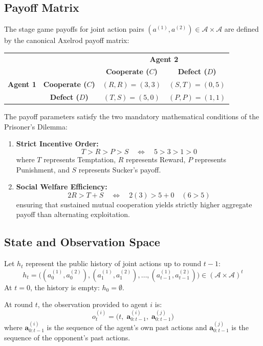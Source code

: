 ﻿\documentclass[11pt,a4paper]{article}
\begin{document}
\subsection{Payoff Matrix}
The stage game payoffs for joint action pairs $(a^{(1)}, a^{(2)}) \in \mathcal{A} \times \mathcal{A}$ are defined by the canonical Axelrod payoff matrix:

\begin{center}
\begin{tabular}{cc|cc}
\multicolumn{2}{c}{} & \multicolumn{2}{c}{\textbf{Agent 2}} \\
& & \textbf{Cooperate ($C$)} & \textbf{Defect ($D$)} \\
\hline
\textbf{Agent 1} & \textbf{Cooperate ($C$)} & $(R, R) = (3, 3)$ & $(S, T) = (0, 5)$ \\
& \textbf{Defect ($D$)} & $(T, S) = (5, 0)$ & $(P, P) = (1, 1)$ \\
\end{tabular}
\end{center}

The payoff parameters satisfy the two mandatory mathematical conditions of the Prisoner's Dilemma:
\begin{enumerate}
    \item \textbf{Strict Incentive Order:}
    \[
    T > R > P > S \quad \iff \quad 5 > 3 > 1 > 0
    \]
    where $T$ represents Temptation, $R$ represents Reward, $P$ represents Punishment, and $S$ represents Sucker's payoff.
    \item \textbf{Social Welfare Efficiency:}
    \[
    2R > T + S \quad \iff \quad 2(3) > 5 + 0 \quad (6 > 5)
    \]
    ensuring that sustained mutual cooperation yields strictly higher aggregate payoff than alternating exploitation.
\end{enumerate}

\subsection{State and Observation Space}
Let $h_t$ represent the public history of joint actions up to round $t-1$:
\[
h_t = \Big( (a_0^{(1)}, a_0^{(2)}), (a_1^{(1)}, a_1^{(2)}), \dots, (a_{t-1}^{(1)}, a_{t-1}^{(2)}) \Big) \in (\mathcal{A} \times \mathcal{A})^t
\]
At $t = 0$, the history is empty: $h_0 = \emptyset$.

At round $t$, the observation provided to agent $i$ is:
\[
o_t^{(i)} = \Big( t, \; \mathbf{a}_{0:t-1}^{(i)}, \; \mathbf{a}_{0:t-1}^{(j)} \Big)
\]
where $\mathbf{a}_{0:t-1}^{(i)}$ is the sequence of the agent's own past actions and $\mathbf{a}_{0:t-1}^{(j)}$ is the sequence of the opponent's past actions.
\end{document}
